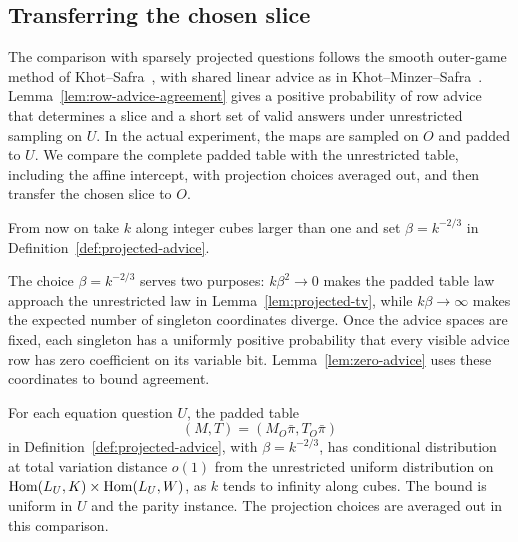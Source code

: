 \subsection{Transferring the chosen slice}

The comparison with sparsely projected questions follows the smooth
outer-game method of Khot--Safra~\cite[Section~3 and Lemma~3.1]{KS13},
with shared linear advice as in Khot--Minzer--Safra~\cite[Sections~3.3--3.4]{KMS17}.
Lemma~\ref{lem:row-advice-agreement} gives a positive probability of row advice
that determines a slice and a short set of valid answers under unrestricted
sampling on $U$.  In the actual experiment, the maps are sampled on $O$
and padded to $U$.  We compare the complete padded table with the
unrestricted table, including the affine intercept, with projection choices
averaged out, and then transfer the chosen slice to $O$.

From now on take $k$ along integer cubes larger than one and set
$\beta=k^{-2/3}$ in Definition~\ref{def:projected-advice}.

The choice $\beta=k^{-2/3}$ serves two purposes: $k\beta^2\to0$ makes
the padded table law approach the unrestricted law in
Lemma~\ref{lem:projected-tv}, while $k\beta\to\infty$ makes the expected
number of singleton coordinates diverge.  Once the advice spaces are
fixed, each singleton has a uniformly positive probability that every
visible advice row has zero coefficient on its variable bit.
Lemma~\ref{lem:zero-advice} uses these coordinates to bound agreement.

\begin{lemma}
\label{lem:projected-tv}
For each equation question $U$, the padded table
\[
 (M,T)=(M_O\bar\pi,T_O\bar\pi)
\]
in Definition~\ref{def:projected-advice}, with $\beta=k^{-2/3}$, has
conditional distribution at total variation distance $o(1)$ from the unrestricted uniform
distribution on $\operatorname{Hom}(L_U,K)\times\operatorname{Hom}(L_U,W)$, as $k$ tends to
infinity along cubes.  The bound is uniform in $U$ and the parity instance.
The projection choices are averaged out in this comparison.
\end{lemma}

